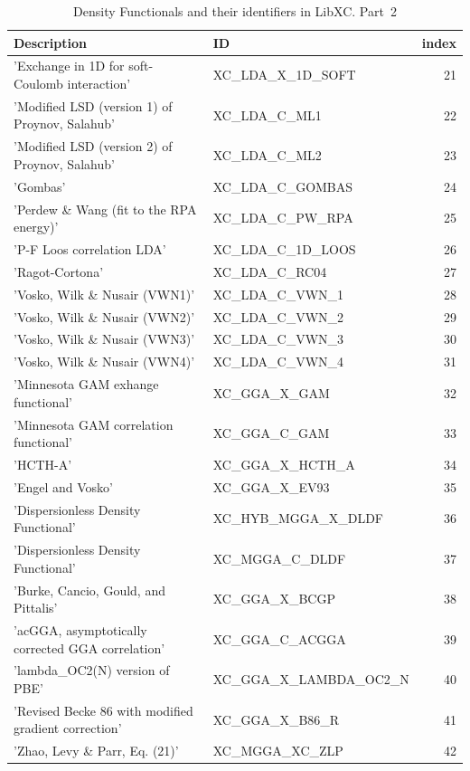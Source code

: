 \documentclass[final,12pt,makeidx,DIV=calc]{article}
\begin{document}
{{{\begin{table}[!h]
\caption{Density Functionals and their identifiers in LibXC. Part~2}
\begin{center}
\begin{tabular}{llr}
\hline
\hline
Description & ID & index\\
\hline
  'Exchange in 1D for soft-Coulomb interaction' & XC\_LDA\_X\_1D\_SOFT  &21\\
  'Modified LSD (version 1) of Proynov, Salahub' & XC\_LDA\_C\_ML1  & 22\\
  'Modified LSD (version 2) of Proynov, Salahub' & XC\_LDA\_C\_ML2  & 23\\
  'Gombas' & XC\_LDA\_C\_GOMBAS  & 24\\
  'Perdew \& Wang (fit to the RPA energy)' & XC\_LDA\_C\_PW\_RPA  & 25\\
  'P-F Loos correlation LDA' & XC\_LDA\_C\_1D\_LOOS  & 26\\
  'Ragot-Cortona' & XC\_LDA\_C\_RC04  & 27\\
  'Vosko, Wilk \& Nusair (VWN1)' & XC\_LDA\_C\_VWN\_1  & 28\\
  'Vosko, Wilk \& Nusair (VWN2)' & XC\_LDA\_C\_VWN\_2  & 29\\
  'Vosko, Wilk \& Nusair (VWN3)' & XC\_LDA\_C\_VWN\_3  & 30\\
  'Vosko, Wilk \& Nusair (VWN4)' & XC\_LDA\_C\_VWN\_4  & 31\\
  'Minnesota GAM exhange functional' & XC\_GGA\_X\_GAM  & 32\\
  'Minnesota GAM correlation functional' & XC\_GGA\_C\_GAM  & 33\\
  'HCTH-A' & XC\_GGA\_X\_HCTH\_A  & 34\\
  'Engel and Vosko' & XC\_GGA\_X\_EV93  & 35\\
  'Dispersionless Density Functional' & XC\_HYB\_MGGA\_X\_DLDF  & 36\\
  'Dispersionless Density Functional' & XC\_MGGA\_C\_DLDF  & 37\\
  'Burke, Cancio, Gould, and Pittalis' & XC\_GGA\_X\_BCGP  & 38\\
  'acGGA, asymptotically corrected GGA correlation' & XC\_GGA\_C\_ACGGA  & 39\\
  'lambda\_OC2(N) version of PBE' & XC\_GGA\_X\_LAMBDA\_OC2\_N  & 40\\
  'Revised Becke 86 with modified gradient correction' & XC\_GGA\_X\_B86\_R  & 41\\
  'Zhao, Levy \& Parr, Eq. (21)' & XC\_MGGA\_XC\_ZLP  & 42\\

\end{tabular}
\end{center}
\end{table}}}}
\end{document}

